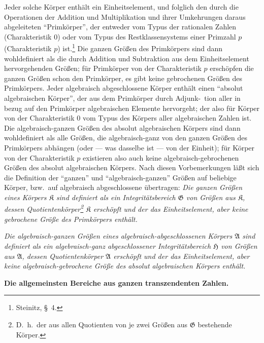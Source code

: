 \documentclass[12pt,a4paper]{article}
\begin{document}
Jeder solche K\"orper enth\"alt ein Einheitselement, und folglich den durch die Operationen der Addition und Multiplikation und ihrer Umkehrungen daraus abgeleiteten ``Primk\"orper'', der entweder vom Typus der rationalen Zahlen (Charakteristik 0) oder vom Typus des Restklassensystems einer Primzahl $p$ (Charakteristik $p$) ist.\footnote{Steinitz, \S\ 4.} Die ganzen Gr\"o\ss en des Primk\"orpers sind dann wohldefiniert als die durch Addition und Subtraktion aus dem Einheitselement hervorgehenden Gr\"o\ss en; f\"ur Primk\"orper von der Charakteristik $p$ ersch\"opfen die ganzen Gr\"o\ss en schon den Primk\"orper, es gibt keine gebrochenen Gr\"o\ss en des Primk\"orpers. Jeder algebraisch abgeschlossene K\"orper enth\"alt einen ``absolut algebraischen K\"orper'', der aus dem Primk\"orper durch Adjunk-\ tion aller in bezug auf den Primk\"orper algebraischen Elemente hervorgeht; der also f\"ur K\"orper von der Charakteristik 0 vom Typus des K\"orpers aller algebraischen Zahlen ist. Die algebraisch-ganzen Gr\"o\ss en des absolut algebraischen K\"orpers sind dann wohldefiniert als alle Gr\"o\ss en, die algebraisch-ganz von den ganzen Gr\"o\ss en des Primk\"orpers abh\"angen (oder --- was dasselbe ist --- von der Einheit); f\"ur K\"orper von der Charakteristik $p$ existieren also auch keine algebraisch-gebrochenen Gr\"o\ss en des absolut algebraischen K\"orpers. Nach diesen Vorbemerkungen l\"a\ss t sich die Definition der ``ganzen'' und ``algebraisch-ganzen'' Gr\"o\ss en auf beliebige K\"orper, bzw.\ auf algebraisch abgeschlossene \"ubertragen: \emph{Die ganzen Gr\"o\ss en eines K\"orpers $\mathfrak{K}$ sind definiert als ein Integrit\"atsbereich $\mathfrak{G}$ von Gr\"o\ss en aus $\mathfrak{K}$, dessen Quotientenk\"orper\footnote{D.\ h.\ der aus allen Quotienten von je zwei Gr\"o\ss en aus $\mathfrak{G}$ bestehende K\"orper.} $\mathfrak{K}$ ersch\"opft und der das Einheitselement, aber keine gebrochene Gr\"o\ss e des Primk\"orpers enth\"alt.}

\emph{Die algebraisch-ganzen Gr\"o\ss en eines algebraisch-abgeschlossenen K\"orpers $\mathfrak{A}$ sind definiert als ein algebraisch-ganz abgeschlossener Integrit\"atsbereich $\mathfrak{H}$ von Gr\"o\ss en aus $\mathfrak{A}$, dessen Quotientenk\"orper $\mathfrak{A}$ ersch\"opft und der das Einheitselement, aber keine algebraisch-gebrochene Gr\"o\ss e des absolut algebraischen K\"orpers enth\"alt.}

\newpage
\begin{center}
\textbf{Die allgemeinsten Bereiche aus ganzen transzendenten Zahlen.}
\end{center}
\end{document}
